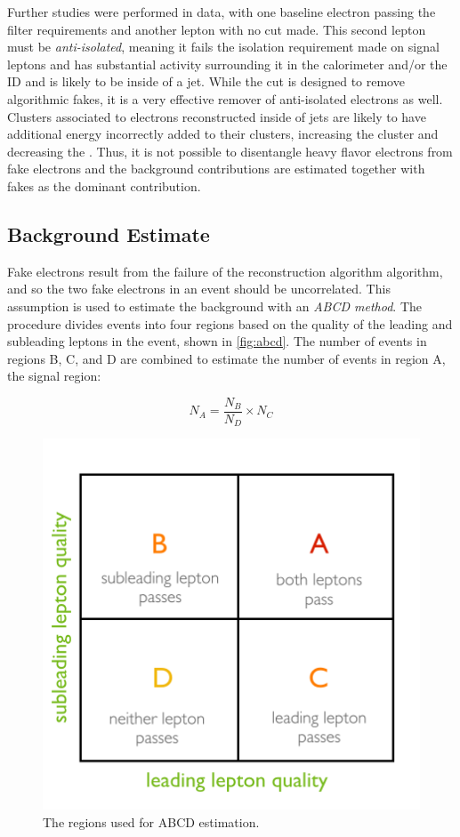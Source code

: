 Further studies were performed in data, with one baseline electron passing the filter requirements and another lepton with no \absdz cut made. This second lepton must be \emph{anti-isolated}, meaning it fails the isolation requirement made on signal leptons and has substantial activity surrounding it in the calorimeter and/or the \ac{ID} and is likely to be inside of a jet. While the \dpt cut is designed to remove algorithmic fakes, it is a very effective remover of anti-isolated electrons as well. Clusters associated to electrons reconstructed inside of jets are likely to have additional energy incorrectly added to their clusters, increasing the cluster \pt and decreasing the \dpt. Thus, it is not possible to disentangle heavy flavor electrons from fake electrons and the background contributions are estimated together with fakes as the dominant contribution.


\subsection{Background Estimate}
Fake electrons result from the failure of the reconstruction algorithm algorithm, and so the two fake electrons in an event should be uncorrelated. This assumption is used to estimate the background with an \emph{ABCD method}. The procedure divides events into four regions based on the quality of the leading and subleading leptons in the event, shown in \autoref{fig:abcd}. The number of events in regions B, C, and D are combined to estimate the number of events in region A, the signal region:

\begin{equation}
N_A = \frac{N_B}{N_D}\times N_C
\end{equation}


\begin{figure}[!ht]
\centering
\includegraphics[width=.5\textwidth]{figures/otherbackgrounds/abcd.png}
\caption{The regions used for ABCD estimation.}
\label{fig:abcd}
\end{figure}


